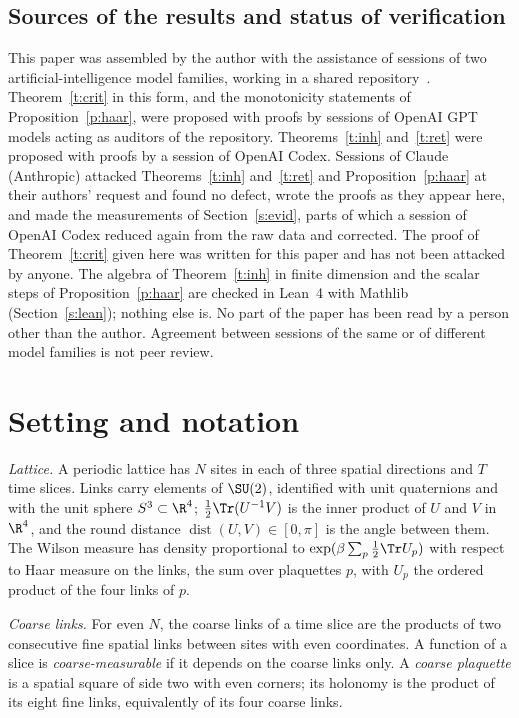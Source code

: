 \subsection{Sources of the results and status of verification}\label{s:disc}
This paper was assembled by the author with the assistance of sessions of two artificial-intelligence model
families, working in a shared repository~\cite{Repo}. Theorem~\ref{t:crit} in this form, and the monotonicity
statements of Proposition~\ref{p:haar}, were proposed with proofs by sessions of OpenAI GPT models acting as
auditors of the repository. Theorems~\ref{t:inh} and~\ref{t:ret} were proposed with proofs by a session of
OpenAI Codex. Sessions of Claude (Anthropic) attacked Theorems~\ref{t:inh} and~\ref{t:ret} and
Proposition~\ref{p:haar} at their authors' request and found no defect, wrote the proofs as they appear here,
and made the measurements of Section~\ref{s:evid}, parts of which a session of OpenAI Codex reduced again from
the raw data and corrected. The proof of Theorem~\ref{t:crit} given here was written for this paper and has not
been attacked by anyone. The algebra of
Theorem~\ref{t:inh} in finite dimension and the scalar steps of Proposition~\ref{p:haar} are checked in
Lean~4 with Mathlib (Section~\ref{s:lean}); nothing else is. No part of the paper has been read by a person
other than the author. Agreement between sessions of the same or of different model families is not peer
review.

\section{Setting and notation}\label{s:set}
\emph{Lattice.} A periodic lattice has $N$ sites in each of three spatial directions and $T$ time slices.
Links carry elements of $\SU(2)$, identified with unit quaternions and with the unit sphere $S^3\subset\R^4$;
$\tfrac12\Tr(U^{-1}V)$ is the inner product of $U$ and $V$ in $\R^4$, and the round distance
$\operatorname{dist}(U,V)\in[0,\pi]$ is the angle between them. The Wilson measure has density proportional
to $\exp(\beta\sum_p\tfrac12\Tr U_p)$ with respect to Haar measure on the links, the sum over plaquettes $p$,
with $U_p$ the ordered product of the four links of $p$.

\emph{Coarse links.} For even $N$, the coarse links of a time slice are the products of two consecutive fine
spatial links between sites with even coordinates. A function of a slice is \emph{coarse-measurable} if it
depends on the coarse links only. A \emph{coarse plaquette} is a spatial square of side two with even corners;
its holonomy is the product of its eight fine links, equivalently of its four coarse links.


